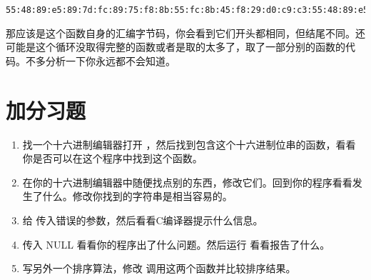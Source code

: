 \begin{Verbatim}
55:48:89:e5:89:7d:fc:89:75:f8:8b:55:fc:8b:45:f8:29:d0:c9:c3:55:48:89:e5:89:
\end{Verbatim}

那应该是这个函数自身的汇编字节码，你会看到它们开头都相同，但结尾不同。还可能是这个循环没取得完整的函数或者是取的太多了，取了一部分别的函数的代码。不多分析一下你永远都不会知道。

\section{加分习题}

\begin{enumerate}
\item 找一个十六进制编辑器打开 ，然后找到包含这个十六进制位串的函数，看看你是否可以在这个程序中找到这个函数。
\item 在你的十六进制编辑器中随便找点别的东西，修改它们。回到你的程序看看发生了什么。修改你找到的字符串是相当容易的。
\item 给  传入错误的参数，然后看看C编译器提示什么信息。
\item 传入 NULL 看看你的程序出了什么问题。然后运行  看看报告了什么。
\item 写另外一个排序算法，修改  调用这两个函数并比较排序结果。
\end{enumerate}


